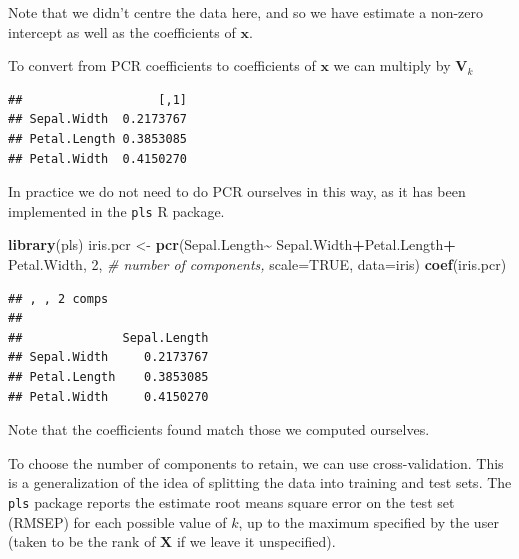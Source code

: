 \documentclass[
]{book}
\newenvironment{Shaded}{\begin{snugshade}}{\end{snugshade}}
\newcommand{\AttributeTok}[1]{\textcolor[rgb]{0.13,0.29,0.53}{#1}}
\newcommand{\CommentTok}[1]{\textcolor[rgb]{0.56,0.35,0.01}{\textit{#1}}}
\newcommand{\ConstantTok}[1]{\textcolor[rgb]{0.56,0.35,0.01}{#1}}
\newcommand{\DecValTok}[1]{\textcolor[rgb]{0.00,0.00,0.81}{#1}}
\newcommand{\FunctionTok}[1]{\textcolor[rgb]{0.13,0.29,0.53}{\textbf{#1}}}
\newcommand{\NormalTok}[1]{#1}
\newcommand{\OtherTok}[1]{\textcolor[rgb]{0.56,0.35,0.01}{#1}}
\newcommand{\SpecialCharTok}[1]{\textcolor[rgb]{0.81,0.36,0.00}{\textbf{#1}}}
\theoremstyle{definition}
\theoremstyle{definition}
\theoremstyle{definition}
\theoremstyle{definition}
\theoremstyle{remark}
\begin{document}
Note that we didn't centre the data here, and so we have estimate a non-zero intercept as well as the coefficients of \(\mathbf x\).

To convert from PCR coefficients to coefficients of \(\mathbf x\) we can multiply by \(\mathbf V_k\)

\begin{Shaded}
\end{Shaded}

\begin{verbatim}
##                   [,1]
## Sepal.Width  0.2173767
## Petal.Length 0.3853085
## Petal.Width  0.4150270
\end{verbatim}

In practice we do not need to do PCR ourselves in this way, as it has been implemented in the \texttt{pls} R package.

\begin{Shaded}
\begin{Highlighting}[]
\FunctionTok{library}\NormalTok{(pls)}
\NormalTok{iris.pcr }\OtherTok{\textless{}{-}} \FunctionTok{pcr}\NormalTok{(Sepal.Length}\SpecialCharTok{\textasciitilde{}}\NormalTok{ Sepal.Width}\SpecialCharTok{+}\NormalTok{Petal.Length}\SpecialCharTok{+}
\NormalTok{                  Petal.Width, }\DecValTok{2}\NormalTok{, }\CommentTok{\# number of components,}
                \AttributeTok{scale=}\ConstantTok{TRUE}\NormalTok{, }\AttributeTok{data=}\NormalTok{iris)}
\FunctionTok{coef}\NormalTok{(iris.pcr)}
\end{Highlighting}
\end{Shaded}

\begin{verbatim}
## , , 2 comps
## 
##              Sepal.Length
## Sepal.Width     0.2173767
## Petal.Length    0.3853085
## Petal.Width     0.4150270
\end{verbatim}

Note that the coefficients found match those we computed ourselves.

To choose the number of components to retain, we can use cross-validation. This is a generalization of the idea of splitting the data into training and test sets. The \texttt{pls} package reports the estimate root means square error on the test set (RMSEP) for each possible value of \(k\), up to the maximum specified by the user (taken to be the rank of \(\mathbf X\) if we leave it unspecified).
\end{document}
